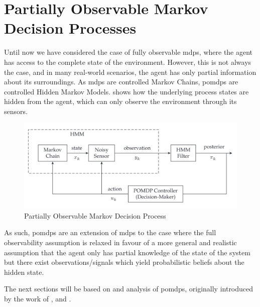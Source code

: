 \chapter{Partially Observable Markov Decision Processes}

Until now we have considered the case of fully observable \glspl{mdp}, 
where the agent has access to the complete state of the environment. However, this is not always the case, 
and in many real-world scenarios, the agent has only partial information about its surroundings. 
As \glspl{mdp} are controlled Markov Chains, \glspl{pomdp} are controlled Hidden Markov Models. 
shows how the underlying process states are hidden from the agent, which can only observe the environment 
through its sensors.
\begin{figure}[H]
    \centering
    \includegraphics[scale=.15]{images/pomdp.png}
    \caption[Partially Observable Markov Decision Process]{Partially Observable Markov Decision Process \citep{Krishnamurthy_2016}}
    \label{fig:pomdp}
\end{figure}
As such, \glspl{pomdp} are an extension of \glspl{mdp} to the case where the full observability assumption is 
relaxed in favour of a more general and realistic assumption that the agent only has partial knowledge 
of the state of the system but there exist observations/signals which yield probabilistic beliefs about 
the hidden state.

The next sections will be based on \cite{Spaan12pomdp} and \cite{Hauskrecht_2000} analysis of \glspl{pomdp},
originally introduced by the work of \cite{drake1962observation} \cite{1307539f-051d-3d3c-a0d8-111443bed03f},
\cite{ASTROM1965174} and \cite{10.1007/BF02055574}.


